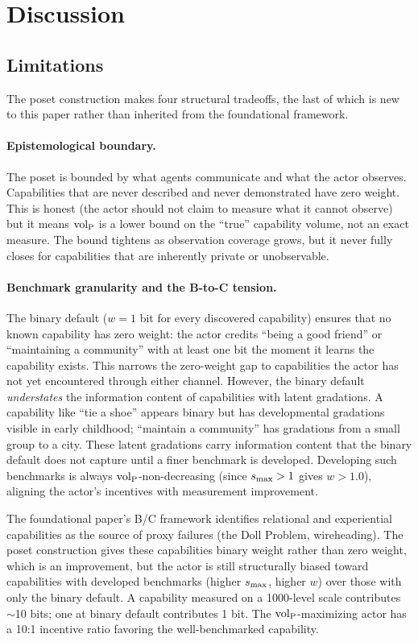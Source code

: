 \section{Discussion}
\label{sec:discussion}

\subsection{Limitations}

The poset construction makes four structural tradeoffs, the last of which is
new to this paper rather than inherited from the foundational framework.

\paragraph{Epistemological boundary.} The poset is bounded by what agents
communicate and what the actor observes. Capabilities that are never described
and never demonstrated have zero weight. This is honest (the actor should not
claim to measure what it cannot observe) but it means ${\operatorname{vol}_{\mathrm{P}}}$ is a lower bound
on the ``true'' capability volume, not an exact measure. The bound tightens as
observation coverage grows, but it never fully closes for capabilities that are
inherently private or unobservable.

\paragraph{Benchmark granularity and the B-to-C tension.} The binary default
($w = 1$ bit for every discovered capability) ensures that no known capability
has zero weight: the actor credits ``being a good friend'' or ``maintaining a
community'' with at least one bit the moment it learns the capability exists.
This narrows the zero-weight gap to capabilities the actor has not yet
encountered through either channel. However, the binary default
\emph{understates} the information content of capabilities with latent
gradations. A capability like ``tie a shoe'' appears binary but has
developmental gradations visible in early childhood; ``maintain a community''
has gradations from a small group to a city. These latent gradations carry
information content that the binary default does not capture until a finer
benchmark is developed. Developing such benchmarks is always
${\operatorname{vol}_{\mathrm{P}}}$-non-decreasing (since $s_{\mathrm{max}} > 1$ gives $w > 1.0$), aligning the
actor's incentives with measurement improvement.

The foundational paper's B/C framework identifies relational and experiential
capabilities as the source of proxy failures (the Doll Problem, wireheading).
The poset construction gives these capabilities binary weight rather than
zero weight, which is an improvement, but the actor is still structurally
biased toward capabilities with developed benchmarks (higher $s_{\mathrm{max}}$, higher
$w$) over those with only the binary default. A capability measured on a
1000-level scale contributes $\sim$10 bits; one at binary default contributes 1
bit. The ${\operatorname{vol}_{\mathrm{P}}}$-maximizing actor has a 10:1 incentive ratio favoring the
well-benchmarked capability.

